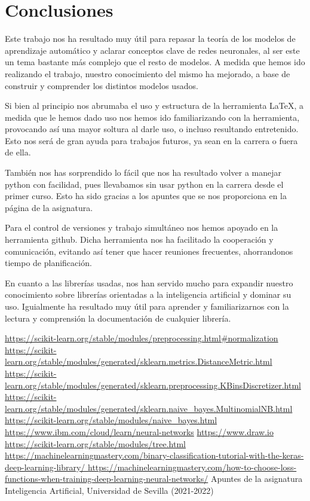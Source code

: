 \documentclass[conference,a4paper]{IEEEtran}
\begin{document}
\section{Conclusiones}



Este trabajo nos ha resultado muy útil para repasar la teoría de los modelos de aprendizaje automático y aclarar conceptos clave de redes neuronales, al ser este un tema bastante más complejo que el resto de modelos. A medida que hemos ido realizando el trabajo, nuestro conocimiento del mismo ha mejorado, a base de construir y comprender los distintos modelos usados. 

Si bien al principio nos abrumaba el uso y estructura de la herramienta \LaTeX, a medida que le hemos dado uso nos hemos ido familiarizando con la herramienta, provocando así una mayor soltura al darle uso, o incluso resultando entretenido. Esto nos será de gran ayuda para trabajos futuros, ya sean en la carrera o fuera de ella.



También nos has sorprendido lo fácil que nos ha resultado volver a manejar python con facilidad, pues llevabamos sin usar python en la carrera desde el primer curso. Esto ha sido gracias a los apuntes que se nos proporciona en la página de la asignatura.

Para el control de versiones y trabajo simultáneo nos hemos apoyado en la herramienta github. Dicha herramienta nos ha facilitado la cooperación y comunicación, evitando así tener que hacer reuniones frecuentes, ahorrandonos tiempo de planificación. 

En cuanto a las librerías usadas, nos han servido mucho para expandir nuestro conocimiento sobre librerías orientadas a la inteligencia artificial y dominar su uso. Iguialmente ha resultado muy útil para aprender y familiarizarnos con la lectura y comprensión la documentación de cualquier librería.\\



\begin{thebibliography}{00}
 \url{https://scikit-learn.org/stable/modules/preprocessing.html#normalization}
 \url{https://scikit-learn.org/stable/modules/generated/sklearn.metrics.DistanceMetric.html}
 \url{https://scikit-learn.org/stable/modules/generated/sklearn.preprocessing.KBinsDiscretizer.html}
 \url{https://scikit-learn.org/stable/modules/generated/sklearn.naive_bayes.MultinomialNB.html}
 \url{https://scikit-learn.org/stable/modules/naive_bayes.html}
 \url{https://www.ibm.com/cloud/learn/neural-networks}
 \url{https://www.draw.io}
 \url{https://scikit-learn.org/stable/modules/tree.html }
 \url{https://machinelearningmastery.com/binary-classification-tutorial-with-the-keras-deep-learning-library/ }
 \url{https://machinelearningmastery.com/how-to-choose-loss-functions-when-training-deep-learning-neural-networks/}
 Apuntes de la asignatura Inteligencia Artificial, Universidad de Sevilla (2021-2022)



\end{thebibliography}
\end{document}
